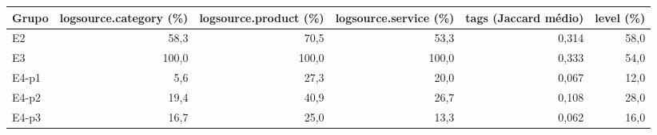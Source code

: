 \begin{tabular}{lrrrrr}
\toprule
Grupo & logsource.category (\%) & logsource.product (\%) & logsource.service (\%) & tags (Jaccard médio) & level (\%) \\
\midrule
E2 & 58,3 & 70,5 & 53,3 & 0,314 & 58,0 \\
E3 & 100,0 & 100,0 & 100,0 & 0,333 & 54,0 \\
E4-p1 & 5,6 & 27,3 & 20,0 & 0,067 & 12,0 \\
E4-p2 & 19,4 & 40,9 & 26,7 & 0,108 & 28,0 \\
E4-p3 & 16,7 & 25,0 & 13,3 & 0,062 & 16,0 \\
\bottomrule
\end{tabular}
